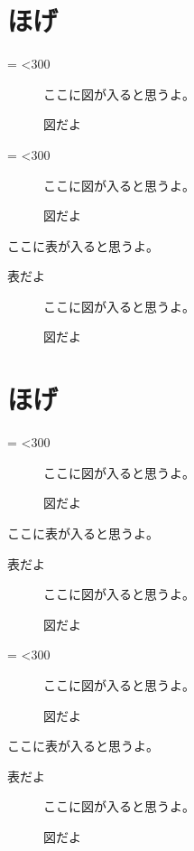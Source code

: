 ﻿\documentclass[a4j,11pt,papersize]{jsarticle}
\makeatletter
\let\hoge\@empty
\def\hoge{%
   \@tempcnta=\z@
   \@whilenum \@tempcnta<300\do{\advance\@tempcnta\@ne あ}%
}
\makeatother
\begin{document}
\section{ほげ}

\hoge

\begin{figure}[htbp]
\centering
ここに図が入ると思うよ。
\caption{図だよ} 
\end{figure}

\hoge

\begin{figure}[htbp]
\centering
ここに図が入ると思うよ。
\caption{図だよ} 
\end{figure}
\begin{table}[htbp]
\centering
ここに表が入ると思うよ。
\caption{表だよ} 
\end{table}

\begin{figure}[htbp]
\centering
ここに図が入ると思うよ。
\caption{図だよ} 
\end{figure}

\section{ほげ}

\hoge

\begin{figure}[htbp]
\centering
ここに図が入ると思うよ。
\caption{図だよ} 
\end{figure}

\begin{table}[htbp]
\centering
ここに表が入ると思うよ。
\caption{表だよ} 
\end{table}

\begin{figure}[htbp]
\centering
ここに図が入ると思うよ。
\caption{図だよ} 
\end{figure}

\hoge

\begin{figure}[htbp]
\centering
ここに図が入ると思うよ。
\caption{図だよ} 
\end{figure}

\begin{table}[htbp]
\centering
ここに表が入ると思うよ。
\caption{表だよ} 
\end{table}

\begin{figure}[htbp]
\centering
ここに図が入ると思うよ。
\caption{図だよ} 
\end{figure}
\end{document}

